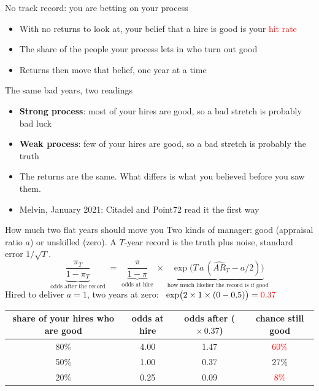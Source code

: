 \documentclass[aspectratio=169,10pt]{beamer}
\begin{document}
\begin{frame}{No track record: you are betting on your process}
\begin{itemize}
\item With no returns to look at, your belief that a hire is good is your \textcolor{red}{hit rate}
\vskip 14pt
\item The share of the people your process lets in who turn out good
\vskip 14pt
\item Returns then move that belief, one year at a time
\end{itemize}
\end{frame}

\begin{frame}{The same bad years, two readings}
\begin{itemize}
\item \textbf{Strong process}: most of your hires are good, so a bad stretch is probably bad luck
\vskip 14pt
\item \textbf{Weak process}: few of your hires are good, so a bad stretch is probably the truth
\vskip 14pt
\item The returns are the same. What differs is what you believed before you saw them.
\vskip 14pt
\item Melvin, January 2021: Citadel and Point72 read it the first way
\end{itemize}
\end{frame}

\begin{frame}[label=bayes]{How much two flat years should move you}
Two kinds of manager: good (appraisal ratio $a$) or unskilled (zero). A $T$-year record is the truth plus noise, standard error $1/\sqrt{T}$.
\[ \underbrace{\frac{\pi_T}{1-\pi_T}}_{\text{odds after the record}} \;=\;
   \underbrace{\frac{\pi}{1-\pi}}_{\text{odds at hire}} \;\times\;
   \underbrace{\exp\!\big( T\,a\,(\widehat{AR}_T - a/2) \big)}_{\text{how much likelier the record is if good}} \]
Hired to deliver $a = 1$, two years at zero: \ $\exp\!\big(2 \times 1 \times (0 - 0.5)\big) = \textcolor{red}{0.37}$
\vskip 2pt
\begin{center}
\renewcommand{\arraystretch}{1.2}
\begin{tabular}{cccc}
\toprule
share of your hires who are good & odds at hire & odds after ($\times\,0.37$) & chance still good \\
\midrule
80\% & 4.00 & 1.47 & \textcolor{red}{60\%} \\
50\% & 1.00 & 0.37 & 27\% \\
20\% & 0.25 & 0.09 & \textcolor{red}{8\%} \\
\bottomrule
\end{tabular}
\end{center}
\end{frame}
\end{document}
